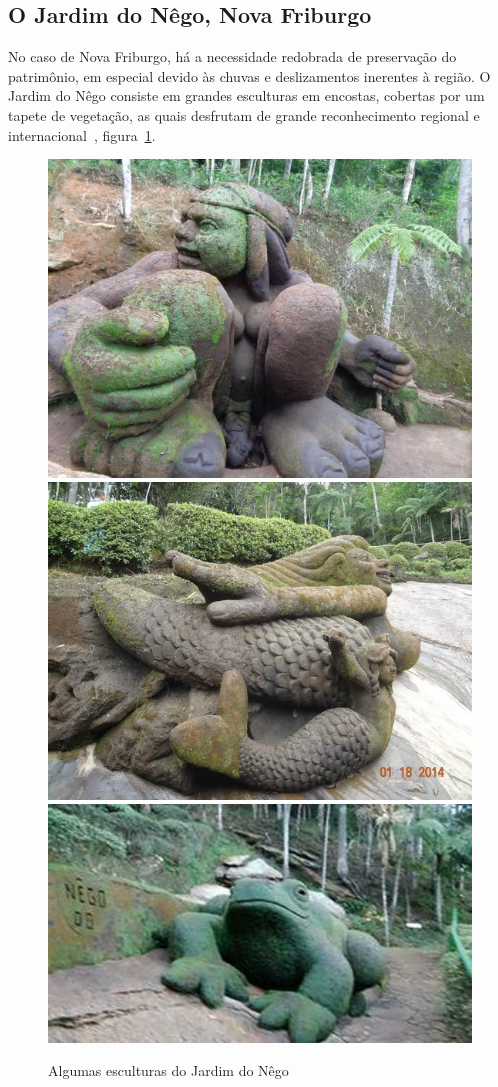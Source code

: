 \subsection*{O Jardim do Nêgo, Nova Friburgo}
No caso de Nova Friburgo, há a necessidade redobrada de preservação do
patrimônio, em especial devido às chuvas e deslizamentos inerentes à região.  O
Jardim do Nêgo consiste em grandes esculturas em encostas, cobertas por um tapete de
vegetação, as quais desfrutam de grande reconhecimento regional e internacional~\cite{JardimDoNego:TheGuardian},
figura~\ref{fig:esculturas}.

\begin{figure} [!h]
	\centering
	\includegraphics[width=0.3\linewidth]{figs/jardim-do-nego.jpg}
	\includegraphics[width=0.3\linewidth]{figs/jardim-do-nego22.jpg}
	\includegraphics[width=0.35\linewidth]{figs/jardim-do-nego32.jpg}
	\caption{Algumas esculturas do Jardim do Nêgo}\label{fig:esculturas}

\end{figure}





